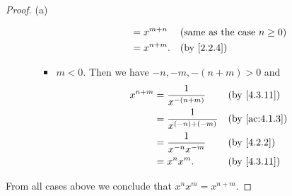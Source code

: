 \begin{proof}{(a)}
\begin{itemize}
\begin{itemize}
\begin{itemize}
\begin{align*}
					                          & = x^{m + n}  &  & \text{(same as the case \(n \geq 0\))} \\
					                          & = x^{n + m}. &  & \by{2.2.4}
				                  \end{align*}
				            \item \(m < 0\).
				                  Then we have \(-n, -m, -(n + m) > 0\) and
				                  \begin{align*}
					                  x^{n + m} & = \dfrac{1}{x^{-(n + m)}}    &  & \by{4.3.11}   \\
					                            & = \dfrac{1}{x^{(-n) + (-m)}} &  & \by{ac:4.1.3} \\
					                            & = \dfrac{1}{x^{-n} x^{-m}}   &  & \by{4.2.2}    \\
					                            & = x^n x^m.                   &  & \by{4.3.11}
				                  \end{align*}
			            \end{itemize}
		      \end{itemize}
	\end{itemize}
	From all cases above we conclude that \(x^n x^m = x^{n + m}\).


\end{proof}
